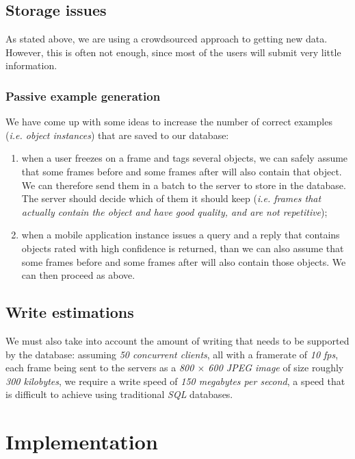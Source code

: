 \documentclass[a4paper,onecolumn,oneside,titlepage,11pt]{report}
\begin{document}
\section{Storage issues}

As stated above, we are using a crowdsourced approach to getting new data. However, this is often not enough, since most of the users will submit very little information.

\subsection{Passive example generation}

We have come up with some ideas to increase the number of correct examples (\emph{i.e. object instances}) that are saved to our database:
\begin{enumerate}
	\item when a user freezes on a frame and tags several objects, we can safely assume that some frames before and some frames after will also contain that object. We can therefore send them in a batch to the server to store in the database. The server should decide which of them it should keep (\emph{i.e. frames that actually contain the object and have good quality, and are not repetitive});
	\item when a mobile application instance issues a query and a reply that contains objects rated with high confidence is returned, than we can also assume that some frames before and some frames after will also contain those objects. We can then proceed as above.
\end{enumerate}

\section{Write estimations}
We must also take into account the amount of writing that needs to be supported by the database: assuming \emph{50 concurrent clients}, all with a framerate of \emph{10 fps}, each frame being sent to the servers as a \emph{800 $\times$ 600 JPEG image} of size roughly \emph{300 kilobytes}, we require a write speed of \emph{150 megabytes per second}, a speed that is difficult to achieve using traditional \emph{SQL} databases.


\chapter{Implementation}
\label{chap:implementation}
\end{document}
